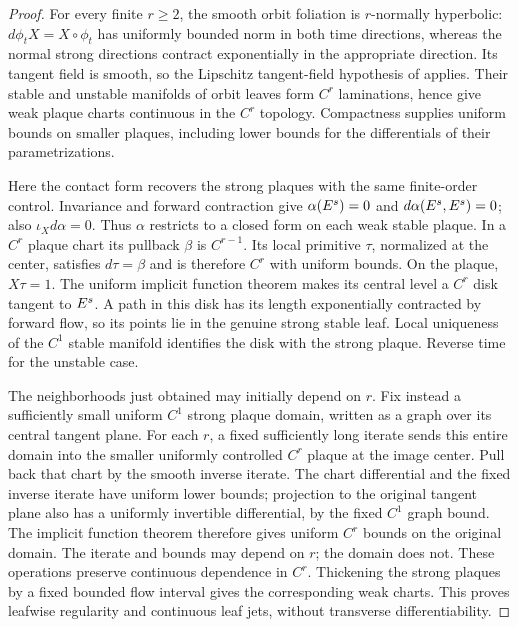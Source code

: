 \begin{proof}
For every finite $r\ge2$, the smooth orbit foliation is $r$-normally
hyperbolic: $d\phi_tX=X\circ\phi_t$ has uniformly bounded norm in
both time directions, whereas the normal strong directions contract
exponentially in the appropriate direction. Its tangent field is
smooth, so the Lipschitz tangent-field hypothesis of
\citet[Section~3, pp.~1017--1018]{HirschPughShub1970} applies.
Their stable and unstable manifolds of orbit leaves form $C^r$
laminations, hence give weak plaque charts continuous in the $C^r$
topology. Compactness supplies uniform bounds on smaller plaques,
including lower bounds for the differentials of their parametrizations.

Here the contact form recovers the strong plaques with the same
finite-order control. Invariance and forward contraction give
$\alpha(E^s)=0$ and $d\alpha(E^s,E^s)=0$; also
$\iota_Xd\alpha=0$. Thus $\alpha$ restricts to a closed form on
each weak stable plaque. In a $C^r$ plaque chart its pullback
$\beta$ is $C^{r-1}$. Its local primitive $\tau$, normalized at
the center, satisfies $d\tau=\beta$ and is therefore $C^r$ with
uniform bounds. On the plaque, $X\tau=1$. The uniform implicit
function theorem makes its central level a $C^r$ disk tangent to
$E^s$. A path in this disk has its length exponentially contracted
by forward flow, so its points lie in the genuine strong stable
leaf. Local uniqueness of the $C^1$ stable manifold identifies
the disk with the strong plaque. Reverse time for the unstable case.

The neighborhoods just obtained may initially depend on $r$.
Fix instead a sufficiently small uniform $C^1$ strong plaque domain,
written as a graph over its central tangent plane. For each $r$,
a fixed sufficiently long iterate sends this entire domain into
the smaller uniformly controlled $C^r$ plaque at the image center.
Pull back that chart by the smooth inverse iterate. The chart
differential and the fixed inverse iterate have uniform lower bounds;
projection to the original tangent plane also has a uniformly
invertible differential, by the fixed $C^1$ graph bound.
The implicit function theorem
therefore gives uniform $C^r$ bounds on the original domain.
The iterate and bounds may depend on $r$; the domain does not.
These operations preserve continuous dependence in $C^r$.
Thickening the strong plaques by a fixed bounded flow interval
gives the corresponding weak charts. This proves leafwise
regularity and continuous leaf jets, without transverse
differentiability.
\end{proof}

